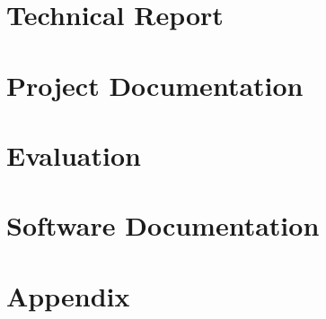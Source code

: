 







\pagestyle{scrheadings} %



\part{Technical Report} %





\newpage
\part{Project Documentation}







\part{Evaluation}

\newpage
\part{Software Documentation}


\appendix
\part{Appendix}


\newpage




